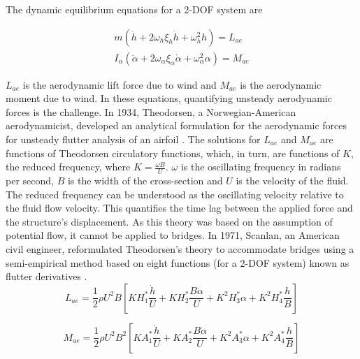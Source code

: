 \documentclass[../main]{subfiles}
\begin{document}
The dynamic equilibrium equations for a 2-DOF system are

\begin{align}
\label{eq:eq_of_motion_h}
m(\ddot{h} + 2\omega_h\xi_h\dot{h} + \omega_h^2 h) = L_{ae} \\
\label{eq:eq_of_motion_alpha}
I_\alpha( \ddot{\alpha} + 2\omega_\alpha\xi_\alpha\dot{\alpha} + \omega_\alpha^2 \alpha) = M_{ae} 
\end{align}

\(L_{ae}\) is the aerodynamic lift force due to wind and \(M_{ae}\) is the aerodynamic moment due to wind. 
In these equations, quantifying unsteady aerodynamic forces is the challenge. In 1934, Theodorsen, a Norwegian-American aerodynamicist, developed an 
analytical formulation for the aerodynamic forces for unsteady flutter analysis of an airfoil \cite{TheodorsenGarrick1934}. The solutions for \(L_{ae}\) and 
\(M_{ae}\) are functions of Theodorsen circulatory functions, which, in turn, are functions of \(K\), the reduced frequency, where 
\(K = \frac{\omega B}{U}\). \(\omega \) is the oscillating frequency in radians per second, \(B\) is the width of the cross-section and \(U\) is the velocity of the fluid. 
The reduced frequency can be understood as the oscillating velocity relative to the fluid flow velocity.
This quantifies the time lag between the applied force and the structure's displacement.  
As this theory was based on the assumption of potential flow, it cannot be applied to bridges. In 1971, Scanlan, 
an American civil engineer, reformulated Theodorsen's theory to accommodate bridges using a semi-empirical method based on eight 
functions (for a 2-DOF system) known as flutter derivatives \cite{scanlan1971}. \\

\begin{equation}
\label{eq:lift_force}
L_{ae} = \frac{1}{2}\rho U^2 B \left[ KH_1^* \frac{\dot{h}}{U} + KH_2^* \frac{B\dot{\alpha}}{U} + K^2 H_3^* \alpha + K^2 H_4^* \frac{h}{B} \right]
\end{equation}

\begin{equation}
\label{eq:moment_force}
M_{ae} = \frac{1}{2}\rho U^2 B^2 \left[ KA_1^* \frac{\dot{h}}{U} + KA_2^* \frac{B\dot{\alpha}}{U} + K^2 A_3^* \alpha + K^2 A_4^* \frac{h}{B} \right]
\end{equation}
\end{document}
